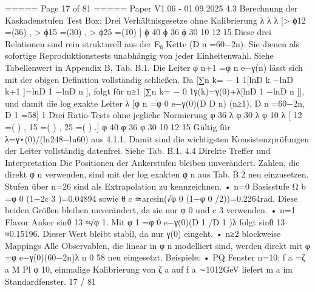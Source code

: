 \begin{MyVerbatim}
===== Page 17 of 81 =====
Paper V1.06 - 01.09.2025
4.3 Berechnung der Kaskadenstufen
Test Box: Drei Verhältnisgesetze ohne Kalibrierung
λ λ λ
[> ϕ12 =(36) , > ϕ15 =(30) , > ϕ25 =(10) ]
ϕ 40 ϕ 36 ϕ 30
10 12 15
Diese drei Relationen sind rein strukturell aus der E₈ Kette (D n =60−2n). Sie dienen als sofortige
Reproduktionstests unabhängig von jeder Einheitenwahl.
Siehe Tabellenwert in Appendix B, Tab. B.1.
Die Leiter φ n+1 =φ n e−γ(n) lässt sich mit der obigen \gamma Definition vollständig schließen.
Da
[∑n
k=
−
1
1[lnD
k
−lnD
k+1
]=lnD
1
−lnD
n
],
folgt für n≥1
[∑n
k=
−
0
1γ(k)=γ(0)+λ[lnD
1
−lnD
n
]],
und damit die log exakte Leiter
λ
[φ
n
=φ
0
e−γ(0)(D
D
n) (n≥1), D
n
=60−2n, D
1
=58]
1
Drei Ratio-Tests ohne jegliche Normierung
φ 36 λ φ 30 λ φ 10 λ
[ 12 =( ) , 15 =( ) , 25 =( ) .]
φ 40 φ 36 φ 30
10 12 15
Gültig für λ=γ⋆(0)/(ln248−ln60) aus 4.1.1. Damit sind die wichtigsten Konsistenzprüfungen der Leiter vollständig
datenfrei. Siehe Tab. B.1.
4.4 Direkte Treffer und Interpretation
Die Positionen der Ankerstufen bleiben unverändert. Zahlen, die direkt φ n verwenden, sind mit der log exakten φ n aus
Tab. B.2 neu einzusetzen. Stufen über n=26 sind als Extrapolation zu kennzeichnen.
• n=0 Basisstufe
Ω b =φ 0 (1−2c 3 )=0.04894 sowie θ c ≃arcsin(√φ 0 (1−φ 0 /2))=0.2264rad. Diese beiden Größen bleiben unverändert,
da sie nur φ 0 und c 3 verwenden.
• n=1 Flavor Anker
sinθ 13 ≈√φ 1. Mit φ 1 =φ 0 e−γ(0)(D 1 /D 1 )λ folgt sinθ 13 ≈0.15196. Dieser Wert bleibt stabil, da nur γ(0) eingeht.
• n≥2 blockweise Mappings
Alle Observablen, die linear in φ n modelliert sind, werden direkt mit
φ =φ e−γ(0)(60−2n)λ
n 0 58
neu eingesetzt.
Beispiele:
• PQ Fenster n=10: f a =ζ a M Pl φ 10, einmalige Kalibrierung von ζ a auf f a ∼1012GeV liefert m a im Standardfenster.
17 / 81


\end{MyVerbatim}
